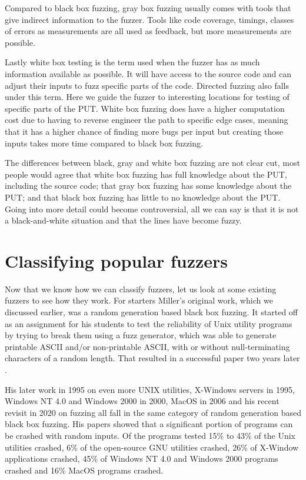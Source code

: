 Compared to black box fuzzing, gray box fuzzing usually comes with tools that give indirect information to the fuzzer. Tools like code coverage, timings, classes of errors as measurements are all used as feedback, but more measurements are possible. 

Lastly white box testing is the term used when the fuzzer has as much information available as possible. It will have access to the source code and can adjust their inputs to fuzz specific parts of the code. Directed fuzzing also falls under this term. Here we guide the fuzzer to interesting locations for testing of specific parts of the PUT. White box fuzzing does have a higher computation cost due to having to reverse engineer the path to specific edge cases, meaning that it has a higher chance of finding more bugs per input but creating those inputs takes more time compared to black box fuzzing. 

The differences between black, gray and white box fuzzing are not clear cut, most people would agree that white box fuzzing has full knowledge about the PUT, including the source code; that gray box fuzzing has some knowledge about the PUT; and that black box fuzzing has little to no knowledge about the PUT. Going into more detail could become controversial, all we can say is that it is not a black-and-white situation and that the lines have become fuzzy.

\section{Classifying popular fuzzers}
\label{fuzzing:OtherFuzzers}
Now that we know how we can classify fuzzers, let us look at some existing fuzzers to see how they work. For starters Miller’s original work, which we discussed earlier, was a random generation based black box fuzzing. It started off as an assignment for his students to test the reliability of Unix utility programs by trying to break them using a fuzz generator, which was able to generate printable ASCII and/or non-printable ASCII, with or without null-terminating characters of a random length. That resulted in a successful paper two years later \cite{4originalFuzzingUnixUtils}. 

His later work in 1995 on even more UNIX utilities, X-Windows servers \cite{26miller1995fuzzrevisited} in 1995, Windows NT 4.0 and Windows 2000 \cite{24MillerWindows} in 2000, MacOS \cite{25MillerOnMacOS} in 2006 and his recent revisit in 2020 on fuzzing \cite{3miller2020relevanceOfClasicalFuzzTesting} all fall in the same category of random generation based black box fuzzing. His papers showed that a significant portion of programs can be crashed with random inputs. Of the programs tested 15\% to 43\% of the Unix utilities crashed, 6\% of the open-source GNU utilities crashed, 26\% of X-Window applications crashed, 45\% of Windows NT 4.0 and Windows 2000 programs crashed and 16\% MacOS programs crashed.

